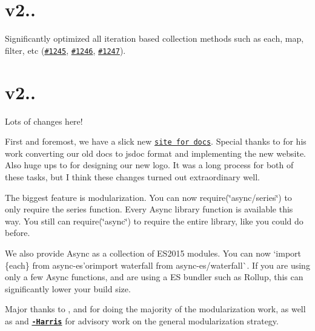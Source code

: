 \section*{v2..}


\begin{DoxyItemize}
\item Significantly optimized all iteration based collection methods such as {\ttfamily each}, {\ttfamily map}, {\ttfamily filter}, etc (\href{https://github.com/caolan/async/issues/1245}{\tt \#1245}, \href{https://github.com/caolan/async/issues/1246}{\tt \#1246}, \href{https://github.com/caolan/async/issues/1247}{\tt \#1247}).
\end{DoxyItemize}

\section*{v2..}

Lots of changes here!

First and foremost, we have a slick new \href{https://caolan.github.io/async/}{\tt site for docs}. Special thanks to \href{https://github.com/hargasinski}{\tt {\bfseries }} for his work converting our old docs to {\ttfamily jsdoc} format and implementing the new website. Also huge ups to \href{https://github.com/ivanseidel}{\tt {\bfseries }} for designing our new logo. It was a long process for both of these tasks, but I think these changes turned out extraordinary well.

The biggest feature is modularization. You can now {\ttfamily require(\char`\"{}async/series\char`\"{})} to only require the {\ttfamily series} function. Every Async library function is available this way. You still can {\ttfamily require(\char`\"{}async\char`\"{})} to require the entire library, like you could do before.

We also provide Async as a collection of E\+S2015 modules. You can now `import \{each\} from \textquotesingle{}async-\/es'{\ttfamily or}import waterfall from \textquotesingle{}async-\/es/waterfall\textquotesingle{}\`{}. If you are using only a few Async functions, and are using a ES bundler such as Rollup, this can significantly lower your build size.

Major thanks to \href{github.com/Kikobeats}{\tt {\bfseries }}, \href{github.com/aearly}{\tt {\bfseries }} and \href{github.com/megawac}{\tt {\bfseries }} for doing the majority of the modularization work, as well as \href{github.com/jdalton}{\tt {\bfseries }} and \href{github.com/Rich-Harris}{\tt {\bfseries -\/\+Harris}} for advisory work on the general modularization strategy.

